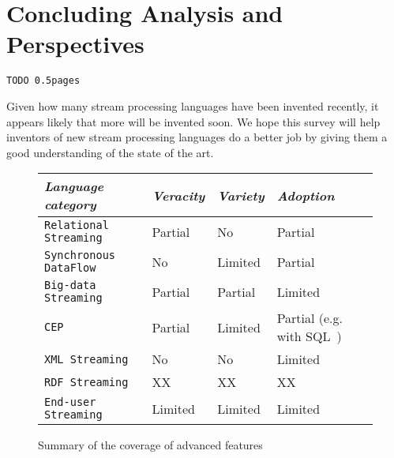 \section{Concluding Analysis and Perspectives}\label{sec:conclusion}

\begin{alltt}TODO\scriptsize ~0.5 pages
\end{alltt}


Given how many stream processing languages have been invented recently, it appears likely that more will be invented soon. We hope this survey will help inventors of new stream processing languages do a better job by giving them a good understanding of the state of the art.

\begin{figure*}\centering%
\begin{tabular}{| l | l | l | l |}\hline
{\em Language category}
& {\em Veracity} & {\em Variety} & {\em Adoption} \\\hline\hline

{\tt Relational Streaming} & Partial \cite{ali_et_al_2009} & No & Partial \cite{jain_et_al_2008} \\\hline
{\tt Synchronous DataFlow}  & No & Limited & Partial \cite{scade_2017} \\\hline
{\tt Big-data Streaming}  & Partial \cite{akidau_et_al_2013} & Partial \cite{hirzel_schneider_gedik_2017} & Limited \\\hline
{\tt CEP} & Partial \cite{chandramouli_goldstein_maier_2010} & Limited & Partial (e.g. with SQL~\cite{zemke_et_al_2007}) \\\hline
{\tt XML Streaming} & No & No & Limited\\\hline
{\tt RDF Streaming} & XX & XX & XX \\\hline
{\tt End-user Streaming} & Limited & Limited & Limited\\\hline
\end{tabular}
\vspace*{-0.2cm}
\caption{Summary of the coverage of advanced features}
\vspace*{-0.3cm}
\end{figure*}
